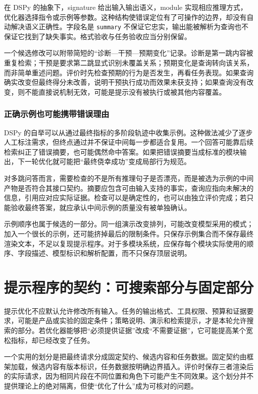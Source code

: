 在 DSPy 的抽象下，signature 给出输入输出语义，module 实现相应推理方式，优化器选择指令或示例等参数\cite{dspy-2310}。这种结构使错误定位有了可操作的边界，却没有自动解决语义正确性。字段名是 \texttt{summary} 不保证它忠实，输出能被解析为查询也不保证它找到了缺失事实。格式验收与任务验收应当分别保留。

一个候选修改可以附带简短的“诊断—干预—预期变化”记录。诊断是第一跳内容被重复检索；干预是要求第二跳显式识别未覆盖关系；预期变化是查询转向该关系，而非简单重述问题。评价时先检查预期的行为是否发生，再看任务表现。如果查询确实改变但最终得分未改善，说明干预执行成功而效果未获支持；如果查询没有改变，则不能直接说机制无效，可能是提示没有被执行或被其他内容覆盖。

\subsubsection{正确示例也可能携带错误理由}

DSPy 的自举可以从通过最终指标的多阶段轨迹中收集示例\cite{dspy-2310}。这种做法减少了逐步人工标注需求，但终点通过并不保证中间每一步都适合复用。一个回答可能靠后续检索纠正了错误摘要，也可能偶然命中答案。如果把错误摘要当成标准的模块输出，下一轮优化就可能把“最终侥幸成功”变成局部行为规范。

对多跳问答而言，需要检查的不是所有推理句子是否漂亮，而是被选为示例的中间产物是否符合其接口契约。摘要应包含可由输入支持的事实，查询应指向未解决的信息，引用应对应实际证据。检查可以是确定性的，也可以由独立评价完成；若只能验收最终答案，就应承认中间示例的质量没有被单独确认。

示例顺序也属于候选的一部分。同一组演示改变排列，可能改变模型采用的模式；加入一个很长的示例，还可能挤掉最后的限制条件。只保存示例集合而不保存最终渲染文本，不足以复现提示程序。对于多模块系统，应保存每个模块实际使用的顺序、字段描述、模型标识和解析配置，而不只保存顶层说明。

\section{提示程序的契约：可搜索部分与固定部分}
\label{sec:ch07-contract}

提示优化不应默认允许修改所有输入。任务的输出格式、工具权限、预算和证据要求，可能是产品或实验的固定条件；策略说明、演示和检索提示，才是本轮允许搜索的部分。若优化器能够把“必须提供证据”改成“不需要证据”，它可能提高某个宽松指标，却已经改变了任务。

一个实用的划分是把最终请求分成固定契约、候选内容和任务数据。固定契约由框架加载，候选内容有版本标识，任务数据按明确边界插入。评价时保存三者渲染后的实际请求，因为相同片段在不同位置和角色下可能产生不同效果。这个划分并不提供理论上的绝对隔离，但使“优化了什么”成为可核对的问题。

